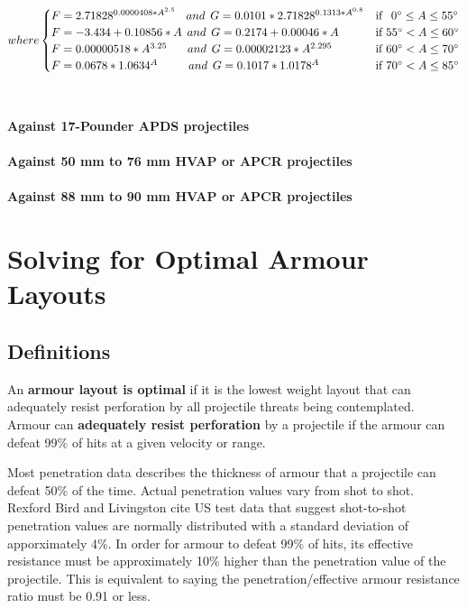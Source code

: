 \documentclass[]{article}
\begin{document}
\[
where
\begin{cases}

F=2.71828^{0.0000408*A^{2.5}}\:\:\:\:and\:\:G=0.0101*2.71828^{0.1313*A^{0.8}} & \text{if \:\:$0\degree \leq A\leq55\degree$} \\
F=-3.434+0.10856*A\:\:and\:\:G=0.2174 + 0.00046*A & \text{if $55\degree<A\leq60\degree$} \\
F=0.00000518*A^{3.25}\:\:\:\:\:\:\:\:and\:\:G=0.00002123*A^{2.295} & \text{if $60\degree<A\leq70\degree$} \\
F=0.0678*1.0634^A\:\:\:\:\:\:\:\:\:\:\:\:and\:\:G=0.1017*1.0178^A & \text{if $70\degree<A\leq85\degree$}

\end{cases}
\]
\\\\
\noindent \textbf{Against 17-Pounder APDS projectiles}
\\\\
\noindent \textbf{Against 50 mm to 76 mm HVAP or APCR projectiles}
\\\\
\noindent \textbf{Against 88 mm to 90 mm HVAP or APCR projectiles}





\section{Solving for Optimal Armour Layouts}
\subsection{Definitions}
\noindent An \textbf{armour layout is optimal} if it is the lowest weight layout that can adequately resist perforation by all projectile threats being contemplated.
\\

\noindent Armour can \textbf{adequately resist perforation} by a projectile if the armour can defeat 99\% of hits at a given velocity or range.

Most penetration data describes the thickness of armour that a projectile can defeat 50\% of the time. Actual penetration values vary from shot to shot. Rexford Bird and Livingston cite US test data that suggest shot-to-shot penetration values are normally distributed with a standard deviation of apporximately 4\%. In order for armour to defeat 99\% of hits, its effective resistance must be approximately 10\% higher than the penetration value of the projectile. This is equivalent to saying the penetration/effective armour resistance ratio must be 0.91 or less.
\\
\end{document}
